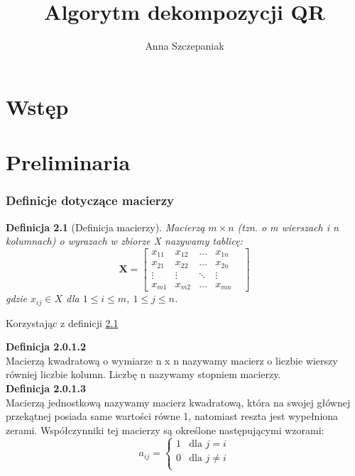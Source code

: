 \documentclass[10pt,a4paper]{report}
\author{Anna Szczepaniak}
\title{Algorytm dekompozycji QR}
\newtheorem{definition}[section]{Definicja}
\begin{document}
\maketitle


\tableofcontents

\chapter{Wstęp}


\chapter{Preliminaria}

\subsection{Definicje dotyczące macierzy} 

\begin{definition}[Definicja macierzy] \label{definicja-macierzy}
Macierzą $m \times n$ (tzn. o m wierszach i n kolumnach) o wyrazach w zbiorze X nazywamy tablicę:
$$
\mathbf{X} =
\begin{bmatrix}
x_{11} & x_{12} & \ldots & x_{1n}&   \\
x_{21} & x_{22} & \ldots & x_{2n}& \\
\vdots & \vdots & \ddots & \vdots \\
x_{m1} & x_{m2} & \ldots & x_{mn}&
\end{bmatrix}
$$
gdzie $x_{ij} \in X$  dla $1\le i\le m$, $1\le j\le n$.
\end{definition}

Korzystając z definicji \ref{definicja-macierzy}

\noindent \textbf{Definicja 2.0.1.2}\\
\noindent Macierzą kwadratową o wymiarze n x n nazywamy macierz o liczbie wierszy równiej liczbie kolumn. Liczbę n nazywamy stopniem macierzy.\\

\noindent \textbf{Definicja 2.0.1.3}\\
\noindent Macierzą jednostkową nazywamy macierz kwadratową, która na swojej głównej przekątnej posiada same wartości równe 1, natomiast reszta jest wypełniona zerami. Współczynniki tej macierzy są określone następującymi wzorami: $$
a_{ij} = \left\{ \begin{array}{ll}
1 & \textrm{dla $j=i$}\\
0 & \textrm{dla $j\ne i$}\\
\end{array} \right.
$$
\end{document}
